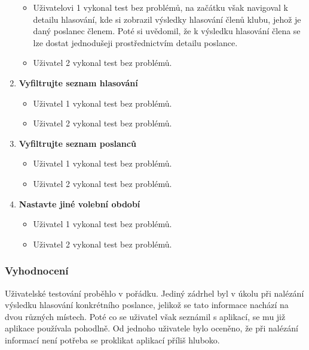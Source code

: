 \begin{enumerate}
		\begin{itemize}
				\item Uživatelovi 1 vykonal test bez problémů, na začátku však navigoval k detailu hlasování, kde si zobrazil výsledky hlasování členů klubu, jehož je daný poslanec členem. Poté si uvědomil, že k výsledku hlasování člena se lze dostat jednodušeji prostřednictvím detailu poslance.
			\item Uživatel 2 vykonal test bez problémů.
		\end{itemize}
	
	
	\item \textbf{Vyfiltrujte seznam hlasování}
	
		\begin{itemize}
			\item Uživatel 1 vykonal test bez problémů.
			\item Uživatel 2 vykonal test bez problémů.
		\end{itemize}
	
	
	\item \textbf{Vyfiltrujte seznam poslanců}
	
		\begin{itemize}
			\item Uživatel 1 vykonal test bez problémů.
			\item Uživatel 2 vykonal test bez problémů.
		\end{itemize}
	
		\item \textbf{Nastavte jiné volební období}
	
		\begin{itemize}
			\item Uživatel 1 vykonal test bez problémů.
			\item Uživatel 2 vykonal test bez problémů.
		\end{itemize}
\end{enumerate}

\subsubsection*{Vyhodnocení}
Uživatelské testování proběhlo v pořádku. Jediný zádrhel byl v úkolu při nalézání výsledku hlasování konkrétního poslance, jelikož se tato informace nachází na dvou různých místech. Poté co se uživatel však seznámil s aplikací, se mu již aplikace používala pohodlně. Od jednoho uživatele bylo oceněno, že při nalézání informací není potřeba se proklikat aplikací příliš hluboko.

